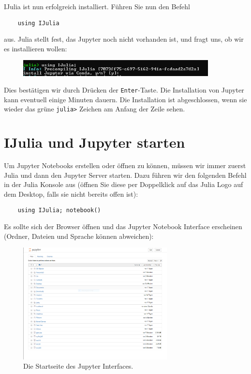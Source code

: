 \documentclass[11pt, a4paper]{scrartcl}
\begin{document}
	IJulia ist nun erfolgreich installiert. Führen Sie nun den Befehl
	
	\begin{lstlisting}
	using IJulia
	\end{lstlisting}
	
	aus. Julia stellt fest, das Jupyter noch nicht vorhanden ist, und fragt uns, ob wir es installieren wollen:
	
	\begin{figure}[h!]
	\centering
	\includegraphics[width=0.9\textwidth]{imgs/Jupyter_install.png}
	\end{figure}

	Dies bestätigen wir durch Drücken der \texttt{Enter}-Taste. Die Installation von Jupyter kann eventuell einige Minuten dauern. Die Installation ist abgeschlossen, wenn sie wieder das grüne \texttt{julia>} Zeichen am Anfang der Zeile sehen.
	
	\section{IJulia und Jupyter starten}
	
	Um Jupyter Notebooks erstellen oder öffnen zu können, müssen wir immer zuerst Julia und dann den Jupyter Server starten. Dazu führen wir den folgenden Befehl in der Julia Konsole aus (öffnen Sie diese per Doppelklick auf das Julia Logo auf dem Desktop, falls sie nicht bereits offen ist):
	
	\begin{lstlisting}
	using IJulia; notebook()
	\end{lstlisting}
	
	Es sollte sich der Browser öffnen und das Jupyter Notebook Interface erscheinen (Ordner, Dateien und Sprache können abweichen):
	
	\begin{figure}[h!]
	\centering
	\includegraphics[width=0.7\textwidth]{imgs/jupyter.png}
	\caption{Die Startseite des Jupyter Interfaces. \label{fig:jupyter}}
	\end{figure}
	
\end{document}
